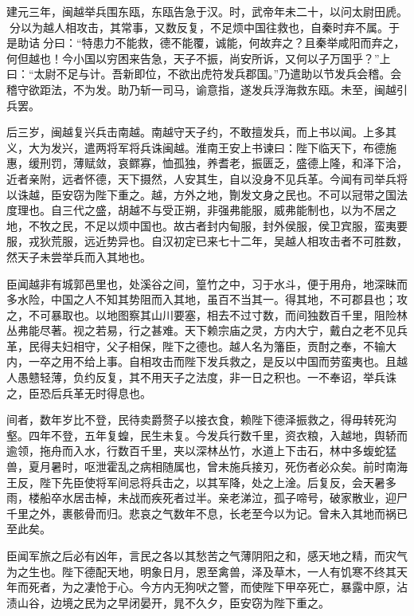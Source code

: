 \documentclass[12pt,UTF8]{ctexbook}
\begin{document}
建元三年，闽越举兵围东瓯，东瓯告急于汉。时，武帝年未二十，以问太尉田虒。分以为越人相攻击，其常事，又数反复，不足烦中国往救也，自秦时弃不属。于是助诘分曰：“特患力不能救，德不能覆，诚能，何故弃之？且秦举咸阳而弃之，何但越也！今小国以穷困来告急，天子不振，尚安所诉，又何以子万国乎？”上曰：“太尉不足与计。吾新即位，不欲出虎符发兵郡国。”乃遣助以节发兵会稽。会稽守欲距法，不为发。助乃斩一司马，谕意指，遂发兵浮海救东瓯。未至，闽越引兵罢。



后三岁，闽越复兴兵击南越。南越守天子约，不敢擅发兵，而上书以闻。上多其义，大为发兴，遣两将军将兵诛闽越。淮南王安上书谏曰：陛下临天下，布德施惠，缓刑罚，薄赋敛，哀鳏寡，恤孤独，养耆老，振匮乏，盛德上隆，和泽下洽，近者亲附，远者怀德，天下摄然，人安其生，自以没身不见兵革。今闻有司举兵将以诛越，臣安窃为陛下重之。越，方外之地，劗发文身之民也。不可以冠带之国法度理也。自三代之盛，胡越不与受正朔，非强弗能服，威弗能制也，以为不居之地，不牧之民，不足以烦中国也。故古者封内甸服，封外侯服，侯卫宾服，蛮夷要服，戎狄荒服，远近势异也。自汉初定已来七十二年，吴越人相攻击者不可胜数，然天子未尝举兵而入其地也。



臣闻越非有城郭邑里也，处溪谷之间，篁竹之中，习于水斗，便于用舟，地深昧而多水险，中国之人不知其势阻而入其地，虽百不当其一。得其地，不可郡县也；攻之，不可暴取也。以地图察其山川要塞，相去不过寸数，而间独数百千里，阻险林丛弗能尽著。视之若易，行之甚难。天下赖宗庙之灵，方内大宁，戴白之老不见兵革，民得夫妇相守，父子相保，陛下之德也。越人名为籓臣，贡酎之奉，不输大内，一卒之用不给上事。自相攻击而陛下发兵救之，是反以中国而劳蛮夷也。且越人愚戆轻薄，负约反复，其不用天子之法度，非一日之积也。一不奉诏，举兵诛之，臣恐后兵革无时得息也。



间者，数年岁比不登，民待卖爵赘子以接衣食，赖陛下德泽振救之，得毋转死沟壑。四年不登，五年复蝗，民生未复。今发兵行数千里，资衣粮，入越地，舆轿而逾领，拖舟而入水，行数百千里，夹以深林丛竹，水道上下击石，林中多蝮蛇猛兽，夏月暑时，呕泄霍乱之病相随属也，曾未施兵接刃，死伤者必众矣。前时南海王反，陛下先臣使将军间忌将兵击之，以其军降，处之上淦。后复反，会天暑多雨，楼船卒水居击棹，未战而疾死者过半。亲老涕泣，孤子啼号，破家散业，迎尸千里之外，裹骸骨而归。悲哀之气数年不息，长老至今以为记。曾未入其地而祸已至此矣。



臣闻军旅之后必有凶年，言民之各以其愁苦之气薄阴阳之和，感天地之精，而灾气为之生也。陛下德配天地，明象日月，恩至禽兽，泽及草木，一人有饥寒不终其天年而死者，为之凄怆于心。今方内无狗吠之警，而使陛下甲卒死亡，暴露中原，沾渍山谷，边境之民为之早闭晏开，晁不久夕，臣安窃为陛下重之。
\end{document}
